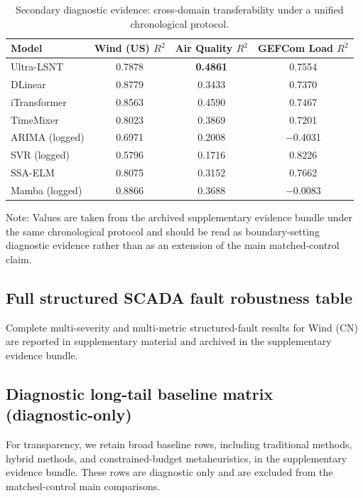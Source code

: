 ﻿\documentclass[review,1p,times]{elsarticle}
\newcommand{\aeTableNote}[1]{%
  \par\vspace{2pt}%
  \noindent\begin{minipage}{\linewidth}
    \raggedright\footnotesize
    Note: #1
  \end{minipage}%
  \par
}
\begin{document}
\begin{table}[t]
\centering
\caption{Secondary diagnostic evidence: cross-domain transferability under a unified chronological protocol.}
\label{tab:table3_transfer}
\label{tab:multi_domain}
\footnotesize
\setlength{\tabcolsep}{4pt}
\begin{tabular*}{0.84\linewidth}{@{\extracolsep{\fill}}lccc@{}}
\toprule
\textbf{Model} & \textbf{Wind (US) $R^2$} & \textbf{Air Quality $R^2$} & \textbf{GEFCom Load $R^2$} \\
\midrule
Ultra-LSNT & 0.7878 & \textbf{0.4861} & 0.7554 \\
DLinear & 0.8779 & 0.3433 & 0.7370 \\
iTransformer & 0.8563 & 0.4590 & 0.7467 \\
TimeMixer & 0.8023 & 0.3869 & 0.7201 \\
ARIMA (logged) & 0.6971 & 0.2008 & $-$0.4031 \\
SVR (logged) & 0.5796 & 0.1716 & 0.8226 \\
SSA-ELM & 0.8075 & 0.3152 & 0.7662 \\
Mamba (logged) & 0.8866 & 0.3688 & $-$0.0083 \\
\bottomrule
\end{tabular*}
\aeTableNote{Values are taken from the archived supplementary evidence bundle under the same chronological protocol and should be read as boundary-setting diagnostic evidence rather than as an extension of the main matched-control claim.}
\end{table}

\subsection{Full structured SCADA fault robustness table}
\label{subsec:robust_structured_full}
Complete multi-severity and multi-metric structured-fault results for Wind (CN) are reported in supplementary material and archived in the supplementary evidence bundle.


\subsection{Diagnostic long-tail baseline matrix (diagnostic-only)}
\label{subsec:diag_longtail}
For transparency, we retain broad baseline rows, including traditional methods, hybrid methods, and constrained-budget metaheuristics, in the supplementary evidence bundle. These rows are diagnostic only and are excluded from the matched-control main comparisons.
\end{document}
